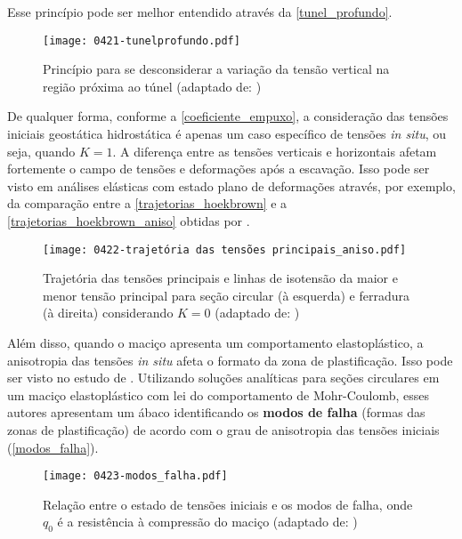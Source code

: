 Esse princípio pode ser melhor entendido através da \autoref{tunel_profundo}.

\begin{figure}[H]
	\begin{center}
		\texttt{[image: 0421-tunelprofundo.pdf]}
	\end{center}
	\caption{\label{tunel_profundo}Princípio para se desconsiderar a variação da tensão vertical na região próxima ao túnel  (adaptado de: )}
\end{figure}

De qualquer forma, conforme a \autoref{coeficiente_empuxo}, a consideração das tensões iniciais geostática hidrostática é apenas um caso específico de tensões \textit{in situ}, ou seja, quando $K=1$. A diferença entre as tensões verticais e horizontais afetam fortemente o campo de tensões e deformações após a escavação. Isso pode ser visto em análises elásticas com estado plano de deformações através, por exemplo, da comparação entre a \autoref{trajetorias_hoekbrown} e a \autoref{trajetorias_hoekbrown_aniso} obtidas por .

\begin{figure}[H]
	\begin{center}
		\texttt{[image: 0422-trajetória das tensões principais\_aniso.pdf]}
	\end{center}
	\caption{\label{trajetorias_hoekbrown_aniso}Trajetória das tensões principais e linhas de isotensão da maior e menor tensão principal para seção circular (à esquerda) e ferradura (à direita) considerando $K=0$  (adaptado de: )}
\end{figure}

Além disso, quando o maciço apresenta um comportamento elastoplástico, a anisotropia das tensões \textit{in situ} afeta o formato da zona de plastificação. Isso pode ser visto no estudo de . Utilizando soluções analíticas para seções circulares em um maciço elastoplástico com lei do comportamento de Mohr-Coulomb, esses autores apresentam um ábaco identificando os \textbf{modos de falha} (formas das zonas de plastificação) de acordo com o grau de anisotropia das tensões iniciais (\autoref{modos_falha}).

\begin{figure}[H]
	\begin{center}
		\texttt{[image: 0423-modos\_falha.pdf]}
	\end{center}
	\caption{\label{modos_falha}Relação entre o estado de tensões iniciais e os modos de falha, onde $q_0$ é a resistência à compressão do maciço (adaptado de: )}
\end{figure}

